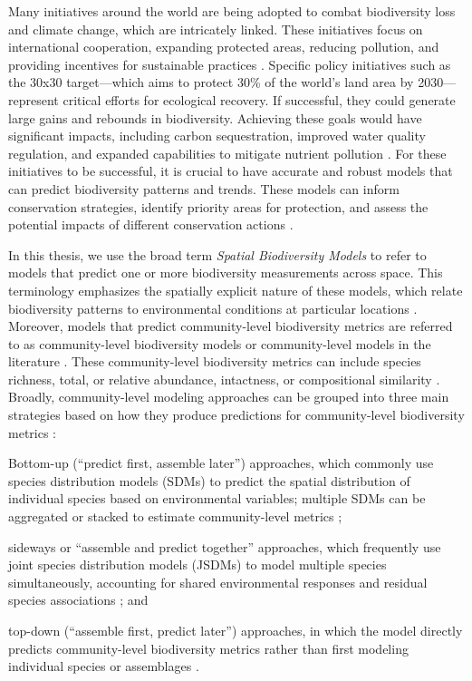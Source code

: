 Many initiatives around the world are being adopted to combat biodiversity loss and climate change, which are intricately linked. These initiatives focus on international cooperation, expanding protected areas, reducing pollution, and providing incentives for sustainable practices 
\parencite{IPBES2019spm, IPCC2023}. Specific policy initiatives such as the 30x30 target---which aims to protect 30\% of the world's land area by 2030---represent critical efforts for ecological recovery. If successful, they could generate large gains and rebounds in biodiversity. Achieving these goals would have significant impacts, including carbon sequestration, improved water quality regulation, and expanded capabilities to mitigate nutrient pollution \parencite{zeng2022}. For these initiatives to be successful, it is crucial to have accurate and robust models that can predict biodiversity patterns and trends. These models can inform conservation strategies, identify priority areas for protection, and assess the potential impacts of different conservation actions \parencite{sinclair2010}.

In this thesis, we use the broad term \emph{Spatial Biodiversity Models} to refer to models that predict one or more biodiversity measurements across space. This terminology emphasizes the spatially explicit nature of these models, which relate biodiversity patterns to environmental conditions at particular locations \parencite{ferrier2006}. Moreover, models that predict community-level biodiversity metrics are referred to as community-level biodiversity models or community-level models in the literature \parencite{ferrier2002, nieto2018}. These community-level biodiversity metrics can include species richness, total, or relative abundance, intactness, or compositional similarity \parencite{lamb2009, santini2017}. Broadly, community-level modeling approaches can be grouped into three main strategies based on how they produce predictions for community-level biodiversity metrics \parencite{ferrier2006}: \begin{inparaenum}[(1)]\item Bottom-up (``predict first, assemble later'') approaches, which commonly use species distribution models (SDMs) to predict the spatial distribution of individual species based on environmental variables; multiple SDMs can be aggregated or stacked to estimate community-level metrics \parencite{ferrier2006, distler2015, beery2021}; \item sideways or ``assemble and predict together'' approaches, which frequently use joint species distribution models (JSDMs) to model multiple species simultaneously, accounting for shared environmental responses and residual species associations \parencite{warton2015,wilkinson2019,pollock2020}; and \item top-down (``assemble first, predict later'') approaches, in which the model directly predicts community-level biodiversity metrics rather than first modeling individual species or assemblages \parencite{ferrier2006, pollock2020}.\end{inparaenum} 

